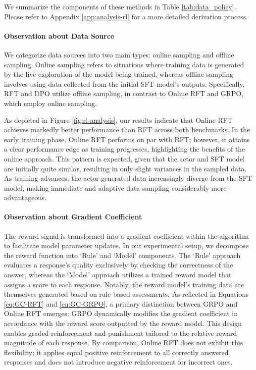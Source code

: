 \begin{itemize}[topsep=0pt]
\begin{itemize}[topsep=0pt]
We summarize the components of these methods in Table \ref{tab:data_policy}.
Please refer to Appendix \ref{app:analysis-rl} for a more detailed derivation process.

\paragraph{Observation about Data Source} We categorize data sources into two main types: online sampling and offline sampling. Online sampling refers to situations where training data is generated by the live exploration of the model being trained, whereas offline sampling involves using data collected from the initial SFT model’s outputs. Specifically, RFT and DPO utilize offline sampling, in contrast to Online RFT and GRPO, which employ online sampling.

As depicted in Figure \ref{fig:rl-analysis}, our results indicate that Online RFT achieves markedly better performance than RFT across both benchmarks. In the early training phase, Online RFT performs on par with RFT; however, it attains a clear performance edge as training progresses, highlighting the benefits of the online approach. This pattern is expected, given that the actor and SFT model are initially quite similar, resulting in only slight variances in the sampled data. As training advances, the actor-generated data increasingly diverge from the SFT model, making immediate and adaptive data sampling considerably more advantageous.

\paragraph{Observation about Gradient Coefficient} The reward signal is transformed into a gradient coefficient within the algorithm to facilitate model parameter updates. In our experimental setup, we decompose the reward function into `Rule' and `Model' components. The `Rule' approach evaluates a response's quality exclusively by checking the correctness of the answer, whereas the `Model' approach utilizes a trained reward model that assigns a score to each response. Notably, the reward model's training data are themselves generated based on rule-based assessments. As reflected in Equations \ref{eq:GC-RFT} and \ref{eq:GC-GRPO}, a primary distinction between GRPO and Online RFT emerges: GRPO dynamically modifies the gradient coefficient in accordance with the reward score outputted by the reward model. This design enables graded reinforcement and punishment tailored to the relative reward magnitude of each response. By comparison, Online RFT does not exhibit this flexibility; it applies equal positive reinforcement to all correctly answered responses and does not introduce negative reinforcement for incorrect ones.


\end{itemize}
\end{itemize}
